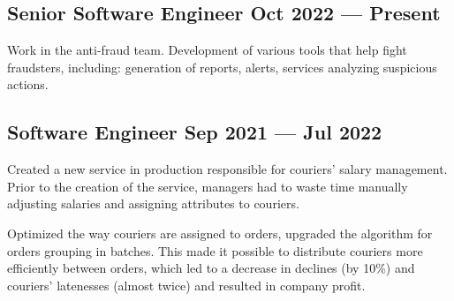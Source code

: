 \documentclass[letter,10pt]{article}
\begin{document}

\subsection{{Senior Software Engineer \hfill Oct 2022 --- Present}}
\begin{zitemize}
\item Work in the anti-fraud team. Development of various tools that help fight fraudsters, including: generation of reports, alerts, services analyzing suspicious actions.
\end{zitemize}

\subsection{{Software Engineer \hfill Sep 2021 --- Jul 2022}}
\begin{zitemize}
\item Created a new service in production responsible for couriers' salary management. Prior to the creation of the service, managers had to waste time manually adjusting salaries and assigning attributes to couriers.
\item Optimized the way couriers are assigned to orders, upgraded the algorithm for orders grouping in batches. This made it possible to distribute couriers more efficiently between orders, which led to a decrease in declines (by 10\%) and couriers' latenesses (almost twice) and resulted in company profit.
\end{zitemize}
\end{document}
